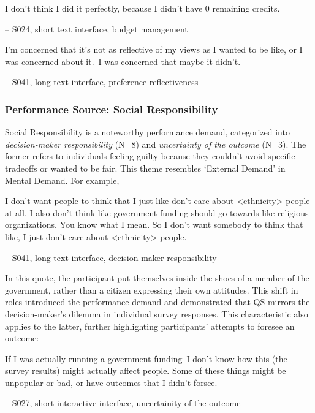\begin{displayquote}
I don't think I did it perfectly, because I didn't have 0 remaining credits.
    
\noindent \hfill -- S024, short text interface, budget management
\end{displayquote}

\begin{displayquote}
I'm concerned that it's not as reflective of my views as I wanted to be like, or I was concerned about it.~\bracketellipsis I was concerned that maybe it didn't.

\noindent \hfill -- S041, long text interface, preference reflectiveness
\end{displayquote}


\subsubsection{Performance Source: Social Responsibility}
Social Responsibility is a noteworthy performance demand, categorized into \textit{decision-maker responsibility} (N=8) and \textit{uncertainty of the outcome} (N=3). The former refers to individuals feeling guilty because they couldn’t avoid specific tradeoffs or wanted to be fair. This theme resembles `External Demand' in Mental Demand. For example,

\begin{displayquote}
I don't want people to think that I just like don't care about <ethnicity> people at all. I also don't think like government funding should go towards like religious organizations. You know what I mean. So I don't want somebody to think that like, I just don't care about <ethnicity> people.
    
\noindent \hfill -- S041, long text interface, decision-maker responsibility
\end{displayquote}

In this quote, the participant put themselves inside the shoes of a member of the government, rather than a citizen expressing their own attitudes. This shift in roles introduced the performance demand and demonstrated that QS mirrors the decision-maker's dilemma in individual survey responses. This characteristic also applies to the latter, further highlighting participants' attempts to foresee an outcome:

\begin{displayquote}
If I was actually running a government funding~\bracketellipsis I don't know how this (the survey results) might actually affect people. Some of these things might be unpopular or bad, or have outcomes that I didn't forsee.
    
\noindent \hfill -- S027, short interactive interface, uncertainity of the outcome
\end{displayquote}

